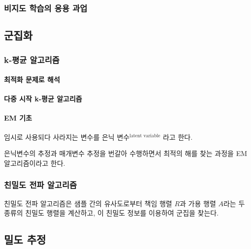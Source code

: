 \documentclass [12pt] {oblivoir}
\let\oldsubsubsection=\subsubsection
\renewcommand{\subsubsection}
{
  \filbreak
  \oldsubsubsection
}
\begin{document}
\subsubsection{비지도 학습의 응용 과업}

\subsection{군집화}

\subsubsection{k-평균 알고리즘}

\paragraph*{최적화 문제로 해석}\mbox{}

\vspace{3mm}

\paragraph*{다중 시작 k-평균 알고리즘}\mbox{}

\vspace{3mm}

\paragraph*{EM 기초}\mbox{}

임시로 사용되다 사라지는 변수를 은닉 변수$^{\text{latent variable}}$ 라고 한다.

\vspace{3mm}

은닉변수의 추정과 매개변수 추정을 번갈아 수행하면서 최적의 해를 찾는 과정을 EM 알고리즘이라고 한다.

\vspace{3mm}

\subsubsection{친밀도 전파 알고리즘}

친밀도 전파 알고리즘은 샘플 간의 유사도로부터 책임 행렬 $R$과 가용 행렬 $A$라는 두 종류의 친밀도 행렬을 계산하고, 이 친밀도 정보를 이용하여 군집을 찾는다.

\subsection{밀도 추정}
\end{document}
